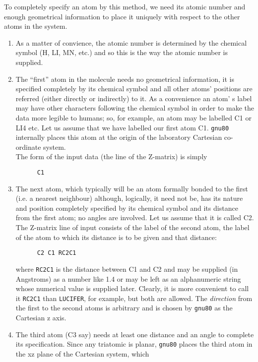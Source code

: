 To completely specify an atom by this method, we need its atomic
number and enough geometrical information to place it uniquely
with respect to the other atoms in the system. 
\begin{enumerate}
\item As a matter of convience,
the atomic number is determined by the chemical symbol (H, LI, MN, etc.)
and so this is the way the atomic number is supplied.
\item The ``first'' atom in the molecule needs no geometrical
information, it is specified completely by its chemical symbol and all
other atoms' positions are referred (either directly or indirectly)
to it. As a convenience an atom' s label may have other characters
following the chemical symbol in order to make the data more legible to
humans; so, for example, an atom may be labelled C1 or LI4 etc.
Let us assume that we have labelled our first atom C1. {\tt gnu80}
internally places this atom at the origin of the laboratory Cartesian
co-ordinate system. \\
The form of the input data (the line of the Z-matrix) is simply
\begin{verbatim}
      C1
\end{verbatim}
\item The next atom, which typically will be an atom formally bonded
to the first (i.e. a nearest neighbour) although, logically, it need not
be, has its nature and position completely specified by its chemical
symbol and its distance from the first atom; no angles are involved.
Let us assume that it is called C2. \\
The Z-matrix line of input consists of the label of the second atom,
the label of the atom to which its distance is to be given and that distance:
\begin{verbatim}
      C2 C1 RC2C1
\end{verbatim}
where {\tt RC2C1} is the distance between C1 and C2 and may be supplied
(in Angstroms) as a number like 1.4 or may be left as an alphanumeric
string whose numerical value is supplied later. Clearly, it is more
convenient to call it {\tt RC2C1} than {\tt LUCIFER}, for example,
but both are allowed.
The {\em direction} from the first to the second atoms is arbitrary and
is chosen by {\tt gnu80} as the Cartesian z axis.
\item The third atom (C3 say) needs at least one distance and an angle
to complete its specification. Since any triatomic is planar, {\tt gnu80}
places the third atom in the xz plane of the Cartesian system, which

\end{enumerate}
